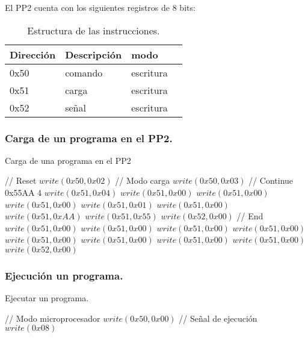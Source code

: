 El PP2 cuenta con los siguientes registros de 8 bits:

\begin{table}[ht]
    \centering
    \begin{tabular}{|l|l|l|l|}
    \hline
    Direcci\'on  & Descripci\'on & modo  \\
    \hline
    0x50 & comando & escritura\\
    \hline
    0x51 & carga   & escritura\\
    \hline
    0x52 & se\~nal   & escritura \\
    \hline
\end{tabular}
\caption{\label{tab:pp2_reg}Estructura de las instrucciones.}
\end{table}
\newpage
\subsubsection{Carga de un programa en el PP2.}
\begin{algorithm}
    \caption{Carga de una programa en el PP2}\label{algo_pp2_load}
    \begin{algorithmic}[1]
    \State // {Reset}
    \State $write(0x50, 0x02)$
    \State // {Modo carga}
    \State $write(0x50, 0x03)$
    \State // {Continue 0x55AA 4}
    \State $write(0x51, 0x04)$
    \State $write(0x51,0x00)$
    \State $write(0x51,0x00)$
    \State $write(0x51,0x00)$
    \State $write(0x51,0x01)$
    \State $write(0x51,0x00)$
    \State $write(0x51,0xAA)$
    \State $write(0x51,0x55)$
    \State $write(0x52, 0x00)$
    \State // {End}
    \State $write(0x51,0x00)$
    \State $write(0x51,0x00)$
    \State $write(0x51,0x00)$
    \State $write(0x51,0x00)$
    \State $write(0x51,0x00)$
    \State $write(0x51,0x00)$
    \State $write(0x51,0x00)$
    \State $write(0x51,0x00)$
    \State $write(0x52,0x00)$
    \EndProcedure
    \end{algorithmic}
    \end{algorithm}

\subsubsection{Ejecuci\'on un programa.}
\begin{algorithm}
    \caption{Ejecutar un programa.}\label{algo_pp2_exe}
    \begin{algorithmic}[1]
    \State // {Modo microprocesador}
    \State $write(0x50, 0x00)$
    \State // {Señal de ejecuci\'on}
    \State $write(0x08)$
    \EndProcedure
    \end{algorithmic}
    \end{algorithm}
\newpage
